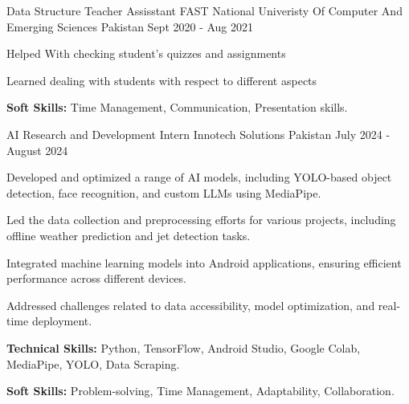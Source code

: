 

\begin{cventries}

  \cventry
    {Data Structure Teacher Assisstant} %
    {FAST National Univeristy Of Computer And Emerging Sciences} %
    {Pakistan} %
    {Sept 2020 - Aug 2021} %
    {
      \begin{cvitems} %
        \item {Helped With checking student's quizzes and assignments}
        \item {Learned dealing with students with respect to different aspects}
        \item {\textbf{Soft Skills:} Time Management, Communication, Presentation skills.}
      \end{cvitems}
    }
     \cventry
    {AI Research and Development Intern} %
    {Innotech Solutions} %
    {Pakistan} %
    {July 2024 - August 2024} %
    {
      \begin{cvitems} %
        \item {Developed and optimized a range of AI models, including YOLO-based object detection, face recognition, and custom LLMs using MediaPipe.}
        \item {Led the data collection and preprocessing efforts for various projects, including offline weather prediction and jet detection tasks.}
        \item {Integrated machine learning models into Android applications, ensuring efficient performance across different devices.}
        \item {Addressed challenges related to data accessibility, model optimization, and real-time deployment.}
        \item {\textbf{Technical Skills:} Python, TensorFlow, Android Studio, Google Colab, MediaPipe, YOLO, Data Scraping.}
        \item {\textbf{Soft Skills:} Problem-solving, Time Management, Adaptability, Collaboration.}

\end{cvitems}}
\end{cventries}
